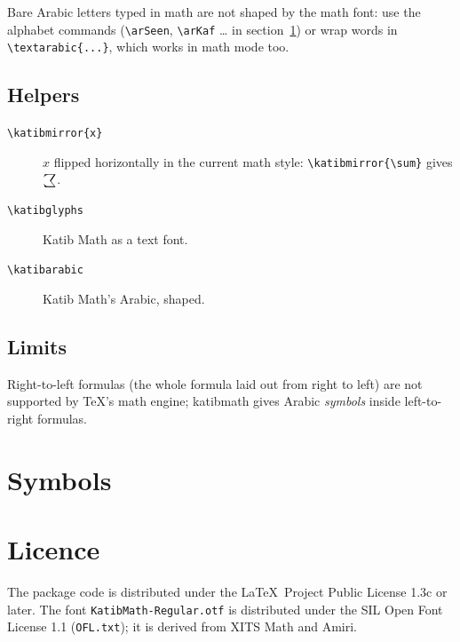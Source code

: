 \documentclass[11pt]{article}
\begin{document}
Bare Arabic letters typed in math are not shaped by the math font: use the
alphabet commands (\verb|\arSeen|, \verb|\arKaf| … in section~\ref{sec:symbols})
or wrap words in \verb|\textarabic{...}|, which works in math mode too.

\subsection*{Helpers}

\begin{description}
  \item[\texttt{\textbackslash katibmirror\{x\}}] $x$ flipped horizontally in the
    current math style: \verb|\katibmirror{\sum}| gives $\katibmirror{\sum}$.
  \item[\texttt{\textbackslash katibglyphs}] Katib Math as a text font.
  \item[\texttt{\textbackslash katibarabic}] Katib Math's Arabic, shaped.
\end{description}

\subsection*{Limits}

Right-to-left formulas (the whole formula laid out from right to left) are not
supported by \TeX's math engine; \textsf{katibmath} gives Arabic \emph{symbols}
inside left-to-right formulas.

\section{Symbols}\label{sec:symbols}


\section{Licence}

The package code is distributed under the \LaTeX\ Project Public License 1.3c or
later. The font \texttt{KatibMath-Regular.otf} is distributed under the SIL Open
Font License 1.1 (\texttt{OFL.txt}); it is derived from XITS Math and Amiri.
\end{document}
